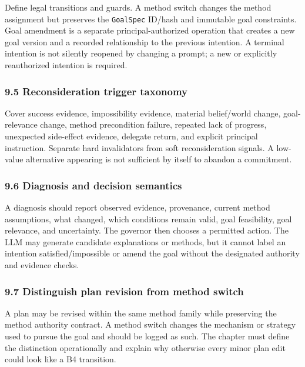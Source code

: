 Define legal transitions and guards. A method switch changes the method assignment but preserves the \texttt{GoalSpec} ID/hash and immutable goal constraints. Goal amendment is a separate principal-authorized operation that creates a new goal version and a recorded relationship to the previous intention. A terminal intention is not silently reopened by changing a prompt; a new or explicitly reauthorized intention is required.

\subsubsection{9.5 Reconsideration trigger taxonomy}\label{reconsideration-trigger-taxonomy}

Cover success evidence, impossibility evidence, material belief/world change, goal-relevance change, method precondition failure, repeated lack of progress, unexpected side-effect evidence, delegate return, and explicit principal instruction. Separate hard invalidators from soft reconsideration signals. A low-value alternative appearing is not sufficient by itself to abandon a commitment.

\subsubsection{9.6 Diagnosis and decision semantics}\label{diagnosis-and-decision-semantics}

A diagnosis should report observed evidence, provenance, current method assumptions, what changed, which conditions remain valid, goal feasibility, goal relevance, and uncertainty. The governor then chooses a permitted action. The LLM may generate candidate explanations or methods, but it cannot label an intention satisfied/impossible or amend the goal without the designated authority and evidence checks.

\subsubsection{9.7 Distinguish plan revision from method switch}\label{distinguish-plan-revision-from-method-switch}

A plan may be revised within the same method family while preserving the method authority contract. A method switch changes the mechanism or strategy used to pursue the goal and should be logged as such. The chapter must define the distinction operationally and explain why otherwise every minor plan edit could look like a B4 transition.

